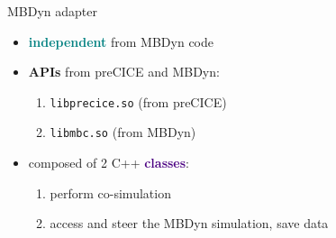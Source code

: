 \documentclass[10pt,t]{beamer}
\begin{document}
\begin{frame}{MBDyn adapter}
    
    
    \begin{itemize}
     \itemsep 8pt
        \item \textcolor{teal}{\textbf{independent}} from MBDyn code
        \item \textcolor{dblue}{\textbf{APIs}} from preCICE and MBDyn:
        \begin{enumerate}
            \itemsep 5pt
            \item \texttt{libprecice.so}   \hspace{0.6cm} (from preCICE)
            \item \texttt{libmbc.so}       \hspace{1.27cm}    (from MBDyn)
        \end{enumerate}
        
        \item composed of 2 C++ \textcolor{indigo}{\textbf{classes}}:
        \begin{enumerate}
            \itemsep 5pt
            \item perform co-simulation
            \item access and steer the MBDyn simulation, save data
        \end{enumerate}
        
    \end{itemize}
\end{frame}
\end{document}
